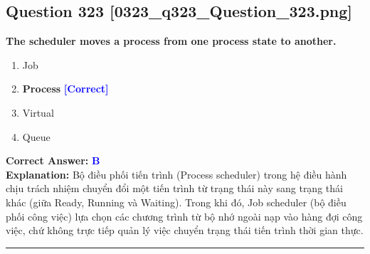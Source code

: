 \documentclass[11pt,a4paper]{article}
\begin{document}
\begin{minipage}{\textwidth}
\subsection*{Question 323 \quad \footnotesize{[0323\_q323\_Question\_323.png]}}
\noindent \textbf{The scheduler moves a process from one process state to another.}

\begin{enumerate}[label=\Alph*.]
    \item Job
    \item \textbf{Process} \hfill \textcolor{blue}{\textbf{[Correct]}}
    \item Virtual
    \item Queue
\end{enumerate}

\noindent \textbf{Correct Answer:} \textcolor{blue}{\textbf{B}} \\[2pt]
\noindent \textbf{Explanation:} Bộ điều phối tiến trình (Process scheduler) trong hệ điều hành chịu trách nhiệm chuyển đổi một tiến trình từ trạng thái này sang trạng thái khác (giữa Ready, Running và Waiting). Trong khi đó, Job scheduler (bộ điều phối công việc) lựa chọn các chương trình từ bộ nhớ ngoài nạp vào hàng đợi công việc, chứ không trực tiếp quản lý việc chuyển trạng thái tiến trình thời gian thực.

\par\vspace{0.3cm}
\hrule
\vspace{0.3cm}
\end{minipage}
\end{document}
